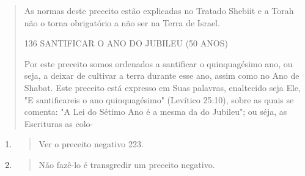 \begin{quote}
As normas deste preceito estão explicadas no Tratado Shebiit e a To­rah
não o torna obrigatório a não ser na Terra de Israel.

136 SANTIFICAR O ANO DO JUBILEU (50 ANOS)

Por este preceito somos ordenados a santificar o quinquagésimo ano, ou
seja, a deixar de cultivar a terra durante esse ano, assim como no Ano
de Shabat. Este preceito está expresso em Suas palavras, enaltecido seja
Ele, "E santificareis o ano quinquagésimo" (Levítico 25:10), sobre as
quais se comen­ta: "A Lei do Sétimo Ano é a mesma da do Jubileu"; ou
séja, as Escrituras as colo-
\end{quote}

\begin{enumerate}
\def\labelenumi{\arabic{enumi}.}
\setcounter{enumi}{170}
\item
  \begin{quote}
  Ver o preceito negativo 223.
  \end{quote}
\item
  \begin{quote}
  Não fazê-lo é transgredir um preceito negativo.
  \end{quote}
\end{enumerate}

